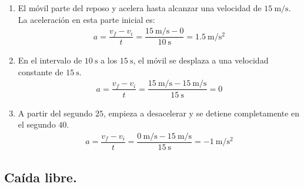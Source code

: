 \documentclass[14pt]{extarticle}
\begin{document}
\begin{enumerate}[label=\roman*)]
\begin{figure}[H]
\end{figure}
\begin{enumerate}
\item El móvil parte del reposo y acelera hasta alcanzar una velocidad de $\SI{15}{\meter\per\second}$.
\\[0.5em]
La aceleración en esta parte inicial es:
\begin{align*}
a = \dfrac{v_{f} - v_{i}}{t} = \dfrac{\SI{15}{\meter\per\second} - 0}{\SI{10}{\second}} = \SI{1.5}{\meter\per\square\second}
\end{align*}
\item En el intervalo de $\SI{10}{\second}$ a los $\SI{15}{\second}$, el móvil se desplaza a una velocidad constante de $\SI{15}{\second}$.
\begin{align*}
a = \dfrac{v_{f} - v_{i}}{t} = \dfrac{\SI{15}{\meter\per\second} - \SI{15}{\meter\per\second}}{\SI{15}{\second}} = 0
\end{align*}
\item A partir del segundo $25$, empieza a desacelerar y se detiene completamente en el segundo $40$.
\begin{align*}
a = \dfrac{v_{f} - v_{i}}{t} = \dfrac{\SI{0}{\meter\per\second} - \SI{15}{\meter\per\second}}{\SI{15}{\second}} = \SI{-1}{\meter\per\square\second}
\end{align*}
\end{enumerate}
\end{enumerate}

\subsection{Caída libre.}
\end{document}
